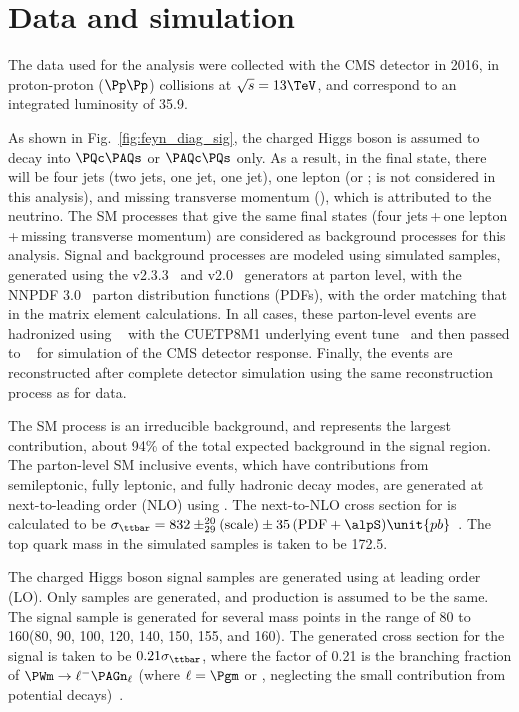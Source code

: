 \section{Data and simulation}
\label{s:secDataMC}
The data used for the analysis were collected with the CMS detector in
2016, in proton-proton ($\Pp\Pp$) collisions at $\sqrt{s} = 13\TeV$,
and correspond to an integrated luminosity of 35.9\fbinv.

As shown in Fig.~\ref{fig:feyn_diag_sig}, the charged Higgs boson is
assumed to decay into $\PQc\PAQs$ or $\PAQc\PQs$ only. As a result, in
the final state, there will be four jets (two \PQb jets, one \PQc jet,
one \PQs jet), one lepton (\Pgm or \Pe; \Pgt is not considered in this
analysis), and missing transverse momentum (\ptmiss), which is
attributed to the neutrino. The SM processes that give the same final
states (four jets\,+\,one lepton\,+\,missing transverse momentum) are
considered as background processes for this analysis. Signal and
background processes are modeled using simulated samples, generated
using the \MGvATNLO v2.3.3~\cite{Alwall:2014hca} and \POWHEG
v2.0~\cite{Frixione:2007vw, Nason:2004rx, Alioli:2010xd, Ball:2017nwa}
generators at parton level, with the NNPDF 3.0~\cite{Ball:2017nwa}
parton distribution functions (PDFs), with the order matching that in
the matrix element calculations. In all cases, these parton-level
events are hadronized using ~\cite{Sjostrand:2014zea}
with the CUETP8M1 underlying event tune~\cite{Khachatryan:2015pea} and
then passed to \GEANTfour~\cite{Agostinelli:2002hh} for simulation of
the CMS detector response. Finally, the events are reconstructed after
complete detector simulation using the same reconstruction process as
for data.

The SM \ttbar process is an irreducible background, and represents
the largest contribution, about 94\% of the total expected background
in the signal region. The parton-level SM inclusive \ttbar events, 
which have contributions from semileptonic, fully leptonic, and 
fully hadronic decay modes, are generated at next-to-leading order (NLO) 
using \POWHEG. The next-to-NLO cross section for \ttbar is calculated 
to be $\sigma_{\ttbar} = 832 \pm^{20}_{29}(\text{scale}) \pm 35\,
(\text{PDF} + \alpS)\unit{pb}$~\cite{Beneke:2011mq}. The top quark
mass in the simulated samples is taken to be 172.5\GeV.

The charged Higgs boson signal samples are generated using \MGvATNLO
at leading order (LO). Only \PSHp samples are generated, and \PSHm
production is assumed to be the same. The signal sample is generated
for several mass points in the range of 80 to 160\GeV (80, 90, 100,
120, 140, 150, 155, and 160\GeV). The generated cross section for the
signal is taken to be $0.21 \sigma_{\ttbar}$, where the factor of
0.21 is the branching fraction of $\PWm \to \ell^- \PAGn_\ell$ (where
$\ell = \Pgm$ or \Pe, neglecting the small contribution from potential
\Pgt decays)~\cite{PDG2018}.

